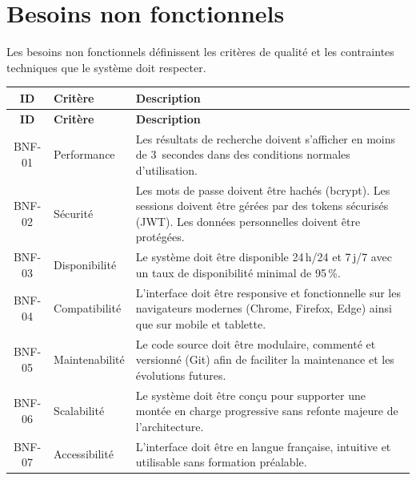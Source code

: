 \documentclass[12pt,a4paper]{report}
\begin{document}
\chapter{Besoins non fonctionnels}

Les besoins non fonctionnels définissent les critères de qualité et les
contraintes techniques que le système doit respecter.

\begin{longtable}{|c|l|p{8cm}|}
\hline
\textbf{ID} & \textbf{Critère} & \textbf{Description} \\
\hline
\endfirsthead
\hline
\textbf{ID} & \textbf{Critère} & \textbf{Description} \\
\hline
\endhead
BNF-01 & Performance & Les résultats de recherche doivent s'afficher en moins
         de 3~secondes dans des conditions normales d'utilisation. \\
\hline
BNF-02 & Sécurité & Les mots de passe doivent être hachés (bcrypt). Les
         sessions doivent être gérées par des tokens sécurisés (JWT). Les
         données personnelles doivent être protégées. \\
\hline
BNF-03 & Disponibilité & Le système doit être disponible 24\,h/24 et 7\,j/7
         avec un taux de disponibilité minimal de 95\,\%. \\
\hline
BNF-04 & Compatibilité & L'interface doit être responsive et fonctionnelle sur
         les navigateurs modernes (Chrome, Firefox, Edge) ainsi que sur mobile
         et tablette. \\
\hline
BNF-05 & Maintenabilité & Le code source doit être modulaire, commenté et
         versionné (Git) afin de faciliter la maintenance et les évolutions
         futures. \\
\hline
BNF-06 & Scalabilité & Le système doit être conçu pour supporter une montée en
         charge progressive sans refonte majeure de l'architecture. \\
\hline
BNF-07 & Accessibilité & L'interface doit être en langue française, intuitive
         et utilisable sans formation préalable. \\
\hline
\end{longtable}

\end{document}
